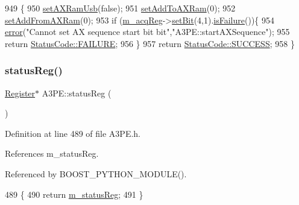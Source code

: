 \begin{DoxyCode}
949                                 \{
950   \hyperlink{classA3PE_a77ccfbd9df2fad96a9a9f1dc579a7a2d}{setAXRamUsb}(\textcolor{keyword}{false});
951   \hyperlink{classA3PE_a54fe4da570ea8833fe2c981de1085387}{setAddToAXRam}(0);
952   \hyperlink{classA3PE_a834fde5951d2c1bf6b41842520360fce}{setAddFromAXRam}(0);
953   \textcolor{keywordflow}{if} (\hyperlink{classA3PE_abaf426f4c9192537117b77f9f4821e04}{m\_acqReg}->\hyperlink{classRegister_ab094246dd12aa7e0aa0ca917f4e70b31}{setBit}(4,1).\hyperlink{classStatusCode_a5dd22dc6eb2c52fc4cabc58f6dea2eb7}{isFailure}())\{
954     \hyperlink{classObject_a204a95f57818c0f811933917a30eff45}{error}(\textcolor{stringliteral}{"Cannot set AX sequence start bit bit"},\textcolor{stringliteral}{"A3PE::startAXSequence"});
955     \textcolor{keywordflow}{return} \hyperlink{classStatusCode_a6f565cbeadc76d14c72f047e5e85eb4ba3da73d4c469762eb9d3c960368252b26}{StatusCode::FAILURE};
956   \}
957   \textcolor{keywordflow}{return} \hyperlink{classStatusCode_a6f565cbeadc76d14c72f047e5e85eb4badd0da38d3ba0d922efd1f4619bc37ad8}{StatusCode::SUCCESS};
958 \}
\end{DoxyCode}
\mbox{\label{classA3PE_af260fc8bce78935b7bad57c987574683}} 
\subsubsection{\texorpdfstring{status\+Reg()}{statusReg()}}
{\footnotesize\ttfamily \hyperlink{classRegister}{Register}$\ast$ A3\+P\+E\+::status\+Reg (\begin{DoxyParamCaption}{ }\end{DoxyParamCaption})\hspace{0.3cm}{\ttfamily [inline]}}



Definition at line 489 of file A3\+P\+E.\+h.



References m\+\_\+status\+Reg.



Referenced by B\+O\+O\+S\+T\+\_\+\+P\+Y\+T\+H\+O\+N\+\_\+\+M\+O\+D\+U\+L\+E().


\begin{DoxyCode}
489                        \{
490     \textcolor{keywordflow}{return} \hyperlink{classA3PE_a2281e3d12a2dffad99ec55be2b695f53}{m\_statusReg};
491   \}
\end{DoxyCode}
\mbox{\label{classA3PE_af241373059bad4a3c376ab2ac98a7b29}} 
